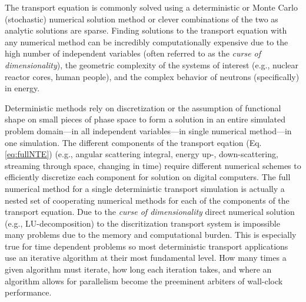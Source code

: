 The transport equation is commonly solved using a deterministic or Monte Carlo (stochastic) \cite{lux_1998} numerical solution method or clever combinations of the two \cite{monke_phd, pasmann_phd} as analytic solutions are sparse.
Finding solutions to the transport equation with any numerical method can be incredibly computationally expensive due to the high number of independent variables (often referred to as the \textit{curse of dimensionality}), the geometric complexity of the systems of interest (e.g., nuclear reactor cores, human people), and the complex behavior of neutrons (specifically) in energy.

Deterministic methods rely on discretization or the assumption of functional shape on small pieces of phase space to form a solution in an entire simulated problem domain---in all independent variables---in single numerical method---in one simulation.
The different components of the transport eqation (Eq. \eqref{eq:fullNTE}) (e.g., angular scattering integral, energy up-, down-scattering, streaming through space, changing in time) require different numerical schemes to efficiently discretize each component for solution on digital computers.
The full numerical method for a single deterministic transport simulation is actually a nested set of cooperating numerical methods for each of the components of the transport equation.
Due to the \textit{curse of dimensionality} direct numerical solution (e.g., LU-decomposition) to the discritization transport system is impossible many problems due to the memory and computational burden.
This is especially true for time dependent problems so most deterministic transport applications use an iterative algorithm at their most fundamental level.
How many times a given algorithm must iterate, how long each iteration takes, and where an algorithm allows for parallelism become the preeminent arbiters of wall-clock performance.

